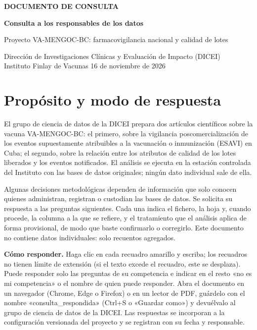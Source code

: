 \documentclass[11pt]{article}
\newcounter{preg}
\begin{document}
\begin{Form}
\raggedright
\begin{center}
{\small\textcolor{azul}{\textbf{DOCUMENTO DE CONSULTA}}\par}
\medskip
{\Large\bfseries Consulta a los responsables de los datos\par}
\medskip
{\large Proyecto VA-MENGOC-BC: farmacovigilancia nacional y calidad de lotes\par}
\medskip
{\small Dirección de Investigaciones Clínicas y Evaluación de Impacto (DICEI)\\
Instituto Finlay de Vacunas \textperiodcentered{} 16 de noviembre de 2026\par}
\end{center}

\section*{\color{azul}Propósito y modo de respuesta}
El grupo de ciencia de datos de la DICEI prepara dos artículos científicos sobre la vacuna
VA-MENGOC-BC: el primero, sobre la vigilancia poscomercialización de los eventos supuestamente
atribuibles a la vacunación o inmunización (ESAVI) en Cuba; el segundo, sobre la relación entre
los atributos de calidad de los lotes liberados y los eventos notificados. El análisis se ejecuta
en la estación controlada del Instituto con las bases de datos originales; ningún dato individual
sale de ella.

Algunas decisiones metodológicas dependen de información que solo conocen quienes administran,
registran o custodian las bases de datos. Se solicita su respuesta a las preguntas siguientes.
Cada una indica el fichero, la hoja y, cuando procede, la columna a la que se refiere, y el
tratamiento que el análisis aplica de forma provisional, de modo que baste confirmarlo o
corregirlo. Este documento no contiene datos individuales: solo recuentos agregados.

\textbf{Cómo responder.} Haga clic en cada recuadro amarillo y escriba; los recuadros no tienen
límite de extensión (si el texto excede el recuadro, este se desplaza). Puede responder solo las
preguntas de su competencia e indicar en el resto «no es mi competencia» o el nombre de quien
puede responder. Abra el documento en un navegador (Chrome, Edge o Firefox) o en un lector de PDF,
guárdelo con el nombre «consulta\_respondida» (Ctrl+S o «Guardar como») y devuélvalo al grupo de
ciencia de datos de la DICEI. Las respuestas se incorporan a la configuración versionada del
proyecto y se registran con su fecha y responsable.


\end{Form}
\end{document}
